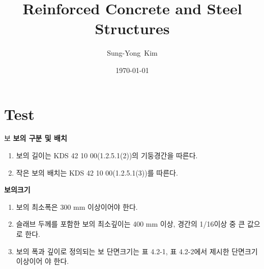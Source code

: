 \documentclass[9pt]{beamer}
\title{Reinforced Concrete and Steel Structures}
\author{Sung-Yong~Kim\inst{1}}
\institute[Changwon National University] %
{
	\inst{1}%
	Associate Professor, School of Architecture\\
	Changwon National University}
\date{\today}
\begin{document}
\begin{frame}
	\titlepage
\end{frame}

\section{Test}	
\begin{frame}{보}
\textbf{보의 구분 및 배치}
\begin{enumerate}
	\item 보의 길이는 KDS 42 10 00(1.2.5.1(2))의 기둥경간을 따른다.
	\item 작은 보의 배치는 KDS 42 10 00(1.2.5.1(3))를 따른다.
\end{enumerate}
 
\textbf{보의크기}
	\begin{enumerate}
		\item 보의 최소폭은 300 mm 이상이어야 한다.
		\item 슬래브 두께를 포함한 보의 최소깊이는 400 mm 이상, 경간의 1/16이상 중 큰 값으로 한다.
		\item 보의 폭과 깊이로 정의되는 보 단면크기는 표 4.2-1, 표 4.2-2에서 제시한 단면크기 이상이어
야 한다.
	\end{enumerate}
\end{frame}
\end{document}
